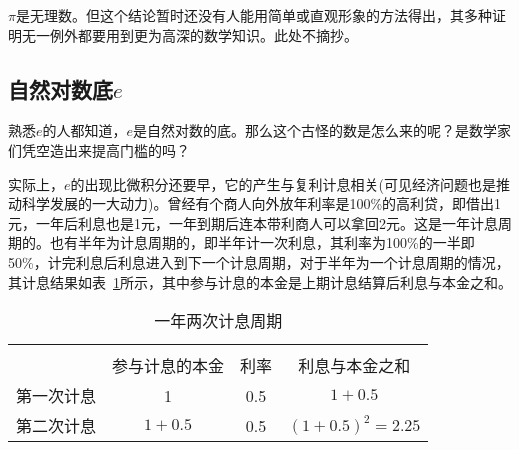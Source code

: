 \begin{example}
  $\pi$是无理数。但这个结论暂时还没有人能用简单或直观形象的方法得出，其多种证明无一例外都要用到更为高深的数学知识。此处不摘抄。
\end{example}

\subsection{自然对数底$e$}
\label{sec:irrational-number-e}

熟悉$e$的人都知道，$e$是自然对数的底。那么这个古怪的数是怎么来的呢？是数学家们凭空造出来提高门槛的吗？

实际上，$e$的出现比微积分还要早，它的产生与复利计息相关(可见经济问题也是推动科学发展的一大动力)。曾经有个商人向外放年利率是100\%的高利贷，即借出1元，一年后利息也是1元，一年到期后连本带利商人可以拿回2元。这是一年计息周期的。也有半年为计息周期的，即半年计一次利息，其利率为100\%的一半即50\%，计完利息后利息进入到下一个计息周期，对于半年为一个计息周期的情况，其计息结果如表~\ref{tab:e-compound-interest}所示，其中参与计息的本金是上期计息结算后利息与本金之和。
\begin{table}[htbp]
  \centering
  \begin{tabular}{cccc}
    \hline\\
              & 参与计息的本金 & 利率 & 利息与本金之和\\\hline
    第一次计息 & 1             & 0.5 & $1 + 0.5$ \\
    第二次计息 & $1 + 0.5$     & 0.5 & $(1 + 0.5)^2=2.25$ \\
    \hline
  \end{tabular}
  \caption{一年两次计息周期}
  \label{tab:e-compound-interest}
\end{table}



